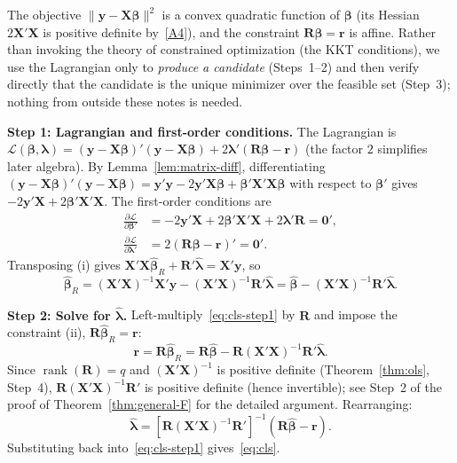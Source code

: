 \documentclass[12pt,a4paper]{article}
\makeatletter
\theoremstyle{definition}
\renewenvironment{proof}[1][\proofname]{\par
  \pushQED{\qed}%
  \normalfont \topsep6\p@\@plus6\p@\relax
  \trivlist
  \item[\hskip\labelsep\bfseries #1\@addpunct{.}]\ignorespaces
}{%
  \popQED\endtrivlist\@endpefalse
}
\DeclareMathOperator\rank{rank}
\newcommand{\bX}{\mathbf{X}}
\newcommand{\by}{\mathbf{y}}
\def\bb{\boldsymbol{\beta}}
\newcommand{\bR}{\mathbf{R}}
\newcommand{\br}{\mathbf{r}}
\newcommand{\bzero}{\mathbf{0}}
\makeatother
\begin{document}
\begin{proof}
The objective $\|\by - \bX\bb\|^2$ is a convex quadratic function of $\bb$ (its Hessian $2\bX'\bX$ is positive definite by~\ref{A4}), and the constraint $\bR\bb = \br$ is affine. Rather than invoking the theory of constrained optimization (the KKT conditions), we use the Lagrangian only to \emph{produce a candidate} (Steps~1--2) and then verify directly that the candidate is the unique minimizer over the feasible set (Step~3); nothing from outside these notes is needed.

\textbf{Step 1: Lagrangian and first-order conditions.} The Lagrangian is $\mathcal{L}(\bb, \boldsymbol\lambda) = (\by - \bX\bb)'(\by - \bX\bb) + 2\boldsymbol\lambda'(\bR\bb - \br)$ (the factor $2$ simplifies later algebra). By Lemma~\ref{lem:matrix-diff}, differentiating $(\by - \bX\bb)'(\by - \bX\bb) = \by'\by - 2\by'\bX\bb + \bb'\bX'\bX\bb$ with respect to $\bb'$ gives $-2\by'\bX + 2\bb'\bX'\bX$. The first-order conditions are
\begin{align*}
\frac{\partial \mathcal{L}}{\partial \bb'} &= -2\by'\bX + 2\bb'\bX'\bX + 2\boldsymbol\lambda'\bR = \bzero', \tag{i}\\
\frac{\partial \mathcal{L}}{\partial \boldsymbol\lambda'} &= 2(\bR\bb - \br)' = \bzero'. \tag{ii}
\end{align*}
Transposing (i) gives $\bX'\bX\hat{\bb}_R + \bR'\hat{\boldsymbol\lambda} = \bX'\by$, so
\begin{equation}\label{eq:cls-step1}
\hat{\bb}_R = (\bX'\bX)^{-1}\bX'\by - (\bX'\bX)^{-1}\bR'\hat{\boldsymbol\lambda} = \hat{\bb} - (\bX'\bX)^{-1}\bR'\hat{\boldsymbol\lambda}.
\end{equation}

\textbf{Step 2: Solve for $\hat{\boldsymbol\lambda}$.} Left-multiply~\eqref{eq:cls-step1} by $\bR$ and impose the constraint (ii), $\bR\hat{\bb}_R = \br$:
\[
\br = \bR\hat{\bb}_R = \bR\hat{\bb} - \bR(\bX'\bX)^{-1}\bR'\hat{\boldsymbol\lambda}.
\]
Since $\rank(\bR) = q$ and $(\bX'\bX)^{-1}$ is positive definite (Theorem~\ref{thm:ols}, Step~4), $\bR(\bX'\bX)^{-1}\bR'$ is positive definite (hence invertible); see Step~2 of the proof of Theorem~\ref{thm:general-F} for the detailed argument. Rearranging:
\[
\hat{\boldsymbol\lambda} = [\bR(\bX'\bX)^{-1}\bR']^{-1}(\bR\hat{\bb} - \br).
\]
Substituting back into~\eqref{eq:cls-step1} gives~\eqref{eq:cls}.


\end{proof}
\end{document}
